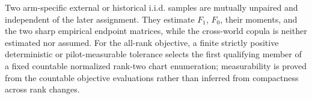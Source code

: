 Two arm-specific external or historical i.i.d. samples are mutually unpaired and independent of the later assignment.  They estimate \(F_1\), \(F_0\), their moments, and the two sharp empirical endpoint matrices, while the cross-world copula is neither estimated nor assumed.  For the all-rank objective, a finite strictly positive deterministic or pilot-measurable tolerance selects the first qualifying member of a fixed countable normalized rank-two chart enumeration; measurability is proved from the countable objective evaluations rather than inferred from compactness across rank changes.